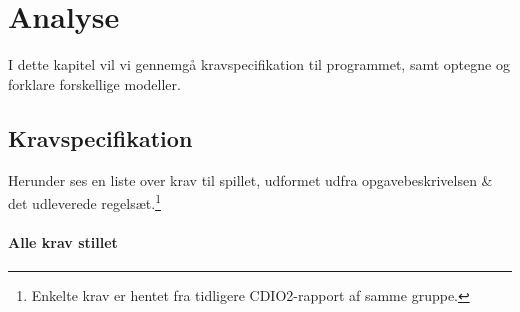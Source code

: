 \chapter{Analyse}

I dette kapitel vil vi gennemgå kravspecifikation til programmet, samt optegne og forklare forskellige modeller.


\section{Kravspecifikation}

Herunder ses en liste over krav til spillet, udformet udfra opgavebeskrivelsen \& det udleverede regelsæt.\footnote{Enkelte krav er hentet fra tidligere CDIO2-rapport af samme gruppe.}

\subsubsection{Alle krav stillet}

